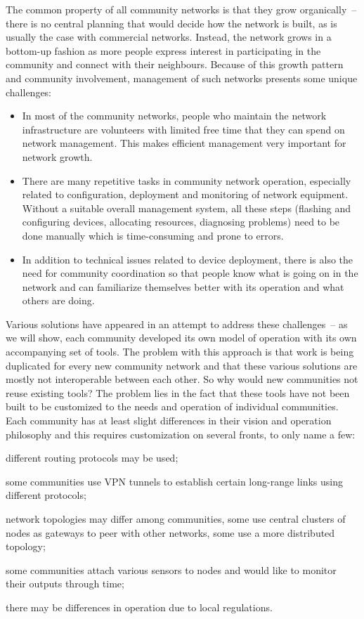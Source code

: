 \documentclass[5p,sort&compress]{elsarticle}
\begin{document}
The common property of all community networks is that they grow organically~-- there is no central planning that would decide how the network is built, as is usually the case with commercial networks. Instead, the network grows in a bottom-up fashion as more people express interest in participating in the community and connect with their neighbours. Because of this growth pattern and community involvement, management of such networks presents some unique challenges:

\begin{itemize}
\item In most of the community networks, people who maintain the network infrastructure are volunteers with limited free time that they can spend on network management. This makes efficient management very important for network growth.

\item There are many repetitive tasks in community network operation, especially related to configuration, deployment and monitoring of network equipment. Without a suitable overall management system, all these steps (flashing and configuring devices, allocating resources, diagnosing problems) need to be done manually which is time-consuming and prone to errors.

\item In addition to technical issues related to device deployment, there is also the need for community coordination so that people know what is going on in the network and can familiarize themselves better with its operation and what others are doing.
\end{itemize}

Various solutions have appeared in an attempt to address these challenges~-- as we will show, each community developed its own model of operation with its own accompanying set of tools. The problem with this approach is that work is being duplicated for every new community network and that these various solutions are mostly not interoperable between each other. So why would new communities not reuse existing tools? The problem lies in the fact that these tools have not been built to be customized to the needs and operation of individual communities. Each community has at least slight differences in their vision and operation philosophy and this requires customization on several fronts, to only name a few:
\begin{enumerate*}[label=\itshape\alph*\upshape)]
\item different routing protocols may be used;
\item some communities use VPN tunnels to establish certain long-range links using different protocols;
\item network topologies may differ among communities, some use central clusters of nodes as gateways to peer with other networks, some use a more distributed topology;
\item some communities attach various sensors to nodes and would like to monitor their outputs through time;
\item there may be differences in operation due to local regulations.
\end{enumerate*}
\end{document}
